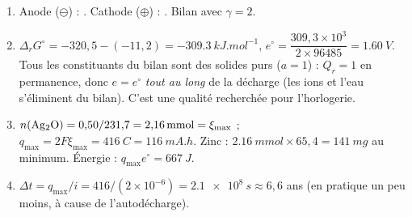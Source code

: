 \correction
\begin{enumerate}
  \item Anode ($\ominus$) : . Cathode ($\oplus$) : . Bilan avec $\gamma = 2$.
  \item $\Delta_rG^\circ = -320{,}5 - (-11{,}2) = \SI{-309,3}{kJ.mol^{-1}}$, $e^\circ = \dfrac{309{,}3\times10^3}{2\times96485} = \SI{1,60}{V}$. Tous les constituants du bilan sont des solides purs ($a = 1$) : $Q_r = 1$ en permanence, donc $e = e^\circ$ \emph{tout au long} de la décharge (les ions  et l'eau s'éliminent du bilan). C'est une qualité recherchée pour l'horlogerie.
  \item $n(\ce{Ag2O}) = 0{,}50/231{,}7 = \SI{2,16}{mmol} = \xi_{\max}$ ; $q_{\max} = 2F\xi_{\max} = \SI{416}{C} = \SI{116}{mA.h}$. Zinc : $\SI{2,16}{mmol}\times65{,}4 = \SI{141}{mg}$ au minimum. Énergie : $q_{\max}e^\circ = \SI{667}{J}$.
  \item $\Delta t = q_{\max}/i = 416/(2\times10^{-6}) = \SI{2,1e8}{s} \approx 6{,}6$ ans (en pratique un peu moins, à cause de l'autodécharge).
\end{enumerate}
